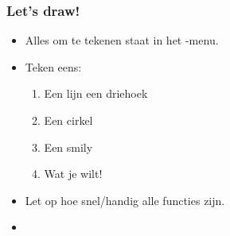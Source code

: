 \begin{frame}
\frametitle{Let's draw!}


\vspace{-1.8cm}

\begin{itemize}
  \item<1-> Alles om te tekenen staat in het \tiDRAW-menu.
  \item<2-> Teken eens:
  \begin{enumerate}
    \item Een lijn \tifonttxt{\>} een driehoek
    \item Een cirkel
    \item Een smily
    \item Wat je wilt!
  \end{enumerate}
  \item<3-> Let op hoe snel/handig alle functies zijn.
  \item<4-> 
\end{itemize}

\vspace{1cm}



\end{frame}
